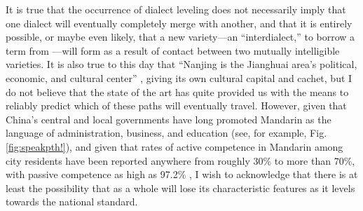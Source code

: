     It is true that the occurrence of dialect leveling does not necessarily imply that one dialect will eventually completely merge with another, and that it is entirely possible, or maybe even likely, that a new variety---an ``interdialect,'' to borrow a term from \citet{trudgill1986dialects}---will form as a result of contact between two mutually intelligible varieties.     It is also true to this day that ``Nanjing is the Jianghuai area's political, economic, and cultural center'' \citep[p.15]{bao1980sixty}, giving \ND{} its own cultural capital and cachet, but I do not believe that the state of the art has quite provided us with the means to reliably predict which of these paths \ND{} will eventually travel. However, given that China's central and local governments have long promoted Mandarin as the language of administration, business, and education (see, for example, Fig. \ref{fig:speakpth!}), and given that rates of active competence in Mandarin among city residents have been reported anywhere from roughly 30\% to more than 70\%, with passive competence as high as 97.2\% \citep{xu2006nanjing}, I wish to acknowledge that there is at least the possibility that \ND{} as a whole will lose its characteristic features as it levels towards the national standard.
